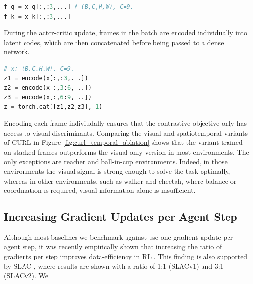 \begin{lstlisting}[language=python]
f_q = x_q[:,:3,...] # (B,C,H,W), C=9.
f_k = x_k[:,:3,...]
\end{lstlisting}


During the actor-critic update, frames in the batch are encoded individually into latent codes, which are then concatenated before being passed to a dense network.

\begin{lstlisting}[language=python]
# x: (B,C,H,W), C=9.
z1 = encode(x[:,:3,...])
z2 = encode(x[:,3:6,...])
z3 = encode(x[:,6:9,...])
z = torch.cat([z1,z2,z3],-1)
\end{lstlisting}


Encoding each frame indiviudally ensures that the contrastive objective only has access to visual discriminants. Comparing the visual and spatiotemporal variants of CURL in Figure \ref{fig:curl_temporal_ablation} shows that the variant trained on stacked frames outperforms the visual-only version in most environments. The only exceptions are reacher and ball-in-cup environments. Indeed, in those environments the visual signal is strong enough to solve the task optimally, whereas in other environments, such as walker and cheetah, where balance or coordination is required, visual information alone is insufficient.

\subsection{Increasing Gradient Updates per Agent Step}

Although most baselines we benchmark against use one gradient update per agent step, it was recently empirically shown that increasing the ratio of gradients per step improves data-efficiency in RL \cite{kielak2020rainbow}. This finding is also supported by SLAC \cite{lee2019stochastic}, where results are shown with a ratio of 1:1 (SLACv1) and 3:1 (SLACv2). We 


